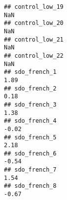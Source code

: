 \documentclass[
]{article}
\begin{document}
\begin{verbatim}
## control_low_19                                                                                                                                                                                                                NaN
## control_low_20                                                                                                                                                                                                                NaN
## control_low_21                                                                                                                                                                                                                NaN
## control_low_22                                                                                                                                                                                                                NaN
## sdo_french_1                                                                                                                                                                                                                 1.89
## sdo_french_2                                                                                                                                                                                                                 0.18
## sdo_french_3                                                                                                                                                                                                                 1.38
## sdo_french_4                                                                                                                                                                                                                -0.02
## sdo_french_5                                                                                                                                                                                                                 2.18
## sdo_french_6                                                                                                                                                                                                                -0.54
## sdo_french_7                                                                                                                                                                                                                 1.54
## sdo_french_8                                                                                                                                                                                                                -0.67

\end{verbatim}
\end{document}
